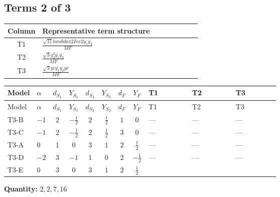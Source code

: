 \documentclass[8pt]{article}
\begin{document}
\begin{landscape}
\subsection*{Terms 2 of 3}
\begin{center}
\begin{tabular}{@{}c >{\raggedright\arraybackslash}p{0.82\linewidth}@{}}
\toprule
Column & Representative term structure \\
\midrule
T1 & \(\displaystyle \frac{\sqrt{11} lambda12Inv2 \overline{y_{1}} \overline{y_{2}}}{MF}\) \\
\midrule
T2 & \(\displaystyle \frac{\sqrt{3} g_{2}^{2} \overline{y_{1}} \overline{y_{2}}}{MF}\) \\
\midrule
T3 & \(\displaystyle \frac{\sqrt{3} ye \overline{y_{1}} \overline{y_{2}} \overline{ye}}{MF}\) \\
\midrule
\bottomrule
\end{tabular}
\end{center}
\smallskip
\tiny
\begin{longtable}{@{}llcccccc >{\raggedright\arraybackslash}p{0.21\linewidth} >{\raggedright\arraybackslash}p{0.21\linewidth} >{\raggedright\arraybackslash}p{0.21\linewidth}@{}}
\toprule
Model & $\alpha$ & $d_{S_1}$ & $Y_{S_1}$ & $d_{S_2}$ & $Y_{S_2}$ & $d_F$ & $Y_F$ & T1 & T2 & T3 \\
\midrule
\endfirsthead
\toprule
Model & $\alpha$ & $d_{S_1}$ & $Y_{S_1}$ & $d_{S_2}$ & $Y_{S_2}$ & $d_F$ & $Y_F$ & T1 & T2 & T3 \\
\midrule
\endhead
T3-B & $-1$ & $2$ & $-\frac{1}{2}$ & $2$ & $\frac{1}{2}$ & $1$ & $0$ & --- & --- & --- \\
\midrule
T3-C & $-1$ & $2$ & $-\frac{1}{2}$ & $2$ & $\frac{1}{2}$ & $3$ & $0$ & --- & --- & --- \\
\midrule
T3-A & $0$ & $1$ & $0$ & $3$ & $1$ & $2$ & $\frac{1}{2}$ & --- & --- & --- \\
\midrule
T3-D & $-2$ & $3$ & $-1$ & $1$ & $0$ & $2$ & $-\frac{1}{2}$ & --- & --- & --- \\
\midrule
T3-E & $0$ & $3$ & $0$ & $3$ & $1$ & $2$ & $\frac{1}{2}$ & \scriptsize\adjustbox{max width=\linewidth}{$\begin{gathered} \frac{3 \sqrt{11} lambda12Inv2 \overline{y_{1}} \overline{y_{2}}}{22 MF}\end{gathered}$} & \scriptsize\adjustbox{max width=\linewidth}{$\begin{gathered} \frac{49 \sqrt{3} g_{2}^{2} \overline{y_{1}} \overline{y_{2}}}{24 MF}\end{gathered}$} & \scriptsize\adjustbox{max width=\linewidth}{$\begin{gathered} - \frac{\sqrt{3} ye \overline{y_{1}} \overline{y_{2}} \overline{ye}}{12 MF}\end{gathered}$} \\
\midrule
\bottomrule
\end{longtable}
\clearpage
\noindent\textbf{Quantity: }$\mathrm{2,2,7,16}$\par\smallskip

\end{landscape}
\end{document}
